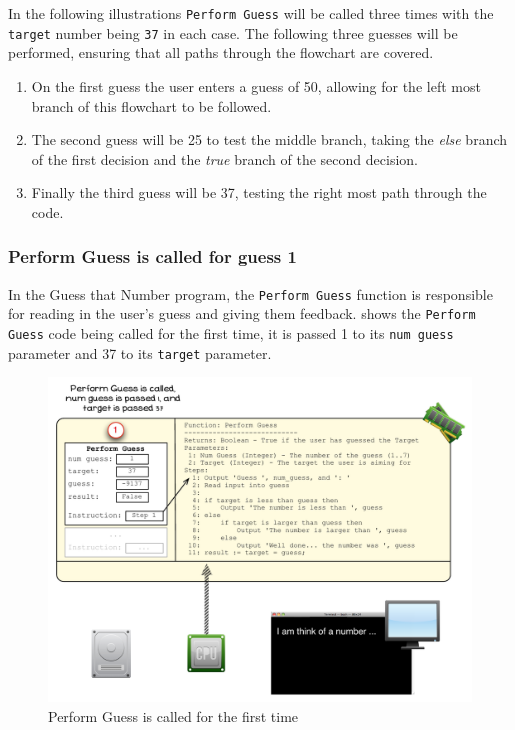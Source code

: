 In the following illustrations \texttt{Perform Guess} will be called three times with the \texttt{target} number being \texttt{37} in each case. The following three guesses will be performed, ensuring that all paths through the flowchart are covered.
\begin{enumerate}
  \item On the first guess the user enters a guess of 50, allowing for the left most branch of this flowchart to be followed. 
  \item The second guess will be 25 to test the middle branch, taking the \emph{else} branch of the first decision and the \emph{true} branch of the second decision. 
  \item Finally the third guess will be 37, testing the right most path through the code.
\end{enumerate}


\clearpage
\subsubsection{Perform Guess is called for guess 1} %
\label{ssub:perform_guess_is_called_for_the_first_time}

In the Guess that Number program, the \texttt{Perform Guess} function is responsible for reading in the user's guess and giving them feedback.  shows the \texttt{Perform Guess} code being called for the first time, it is passed 1 to its \texttt{num guess} parameter and 37 to its \texttt{target} parameter.

\begin{figure}[htbp]
   \centering
   \includegraphics[width=\textwidth]{./topics/control-flow/images/PerformGuess1} 
   \caption{Perform Guess is called for the first time}
   \label{fig:perform-guess-1}
\end{figure}

